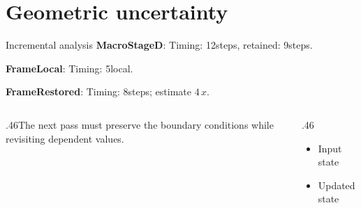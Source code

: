 \documentclass[12pt,aspectratio=169]{beamer}
\newcommand{\fuzzlayerA}[1]{\textbf{#1}}
\newcommand{\fuzzterm}[1]{\fuzzlayerA{#1}}
\newcommand{\fuzzpair}[2]{\fuzzterm{#1}: #2}
\newcommand{\fuzzunit}{steps}
\let\fuzzoriginalunit\fuzzunit
\newcommand{\fuzzcoefficient}{4}
\newcommand{\fuzzscale}[2][\fuzzcoefficient]{#1\,#2}
\begin{document}
\section{Geometric uncertainty}
\begin{frame}[t]{Incremental analysis}
\fuzzpair{MacroStageD}{Timing: 12\fuzzunit, retained: 9\fuzzoriginalunit.}\par
{\renewcommand{\fuzzunit}{local}\fuzzpair{FrameLocal}{Timing: 5\fuzzunit.}\par}
\fuzzpair{FrameRestored}{Timing: 8\fuzzunit; estimate $\fuzzscale{x}$.}\par
\begin{columns}[T]\begin{column}{.46\textwidth}The next pass must preserve the boundary conditions while revisiting dependent values.\end{column}\begin{column}{.46\textwidth}\begin{itemize}\item Input state\item Updated state\end{itemize}\end{column}\end{columns}
\end{frame}
\end{document}
